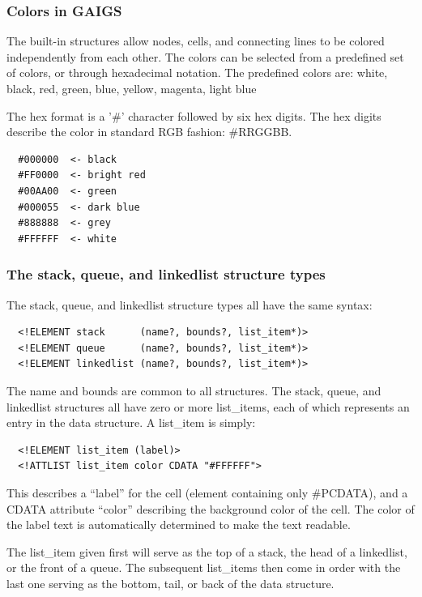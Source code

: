 \documentclass[12pt]{article}
\begin{document}
\subsubsection{Colors in GAIGS}


The built-in structures allow nodes, cells, and connecting lines to be
colored independently from each other. The colors can be selected from
a predefined set of colors, or through hexadecimal notation.  The
predefined colors are: white, black, red, green, blue, yellow,
magenta, light blue

The hex format is a '\#' character followed by six hex digits. The hex
digits describe the color in standard RGB fashion: \#RRGGBB.


\footnotesize \begin{verbatim}
  #000000  <- black
  #FF0000  <- bright red
  #00AA00  <- green
  #000055  <- dark blue
  #888888  <- grey
  #FFFFFF  <- white
\end{verbatim} \normalsize


\subsubsection{The stack, queue, and linkedlist structure types}


The stack, queue, and linkedlist structure types all have the same syntax:

\footnotesize \begin{verbatim}
  <!ELEMENT stack      (name?, bounds?, list_item*)>
  <!ELEMENT queue      (name?, bounds?, list_item*)>
  <!ELEMENT linkedlist (name?, bounds?, list_item*)>
\end{verbatim} \normalsize
  
  The name and bounds are common to all structures.  The stack, queue,
  and linkedlist structures all have zero or more list\_items, each of
  which represents an entry in the data structure. A list\_item is
  simply:

\footnotesize \begin{verbatim}
  <!ELEMENT list_item (label)>
  <!ATTLIST list_item color CDATA "#FFFFFF">
\end{verbatim} \normalsize
  
  This describes a ``label'' for the cell (element containing only
  \#PCDATA), and a CDATA attribute ``color'' describing the background
  color of the cell.  The color of the label text is automatically
  determined to make the text readable.

The list\_item given first will serve as the top of a stack, the head
of a linkedlist, or the front of a queue. The subsequent list\_items
then come in order with the last one serving as the bottom, tail, or
back of the data structure.
\end{document}
